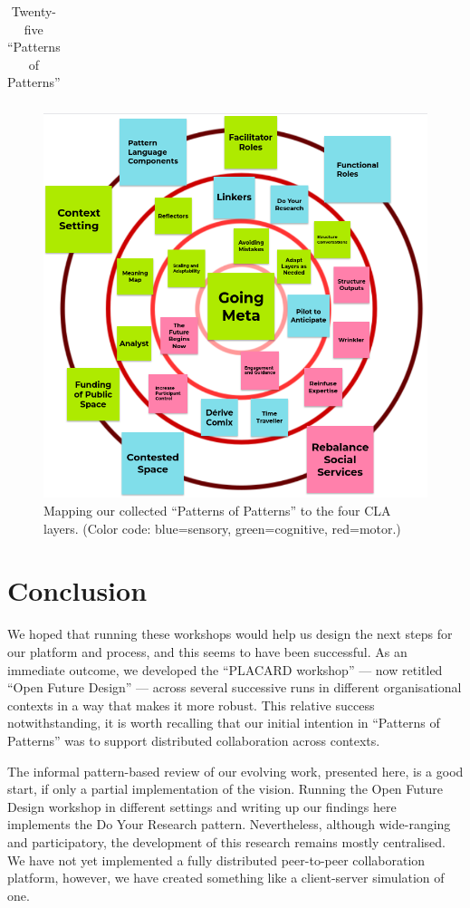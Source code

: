\documentclass[acmlarge,timestamp]{acmart}
\begin{document}
\begin{table}
\begin{tabular}{rll}
  \end{tabular}
  \smallskip
  \caption{Twenty-five “Patterns of Patterns”\label{summary}}
\end{table}

\begin{figure}[h]
\includegraphics[trim={0 0 0 .1cm},clip=true, width=.9\textwidth]{map-of-patterns.png}
\caption{Mapping our collected “Patterns of Patterns” to the four CLA layers. (Color code: blue=sensory, green=cognitive, red=motor.)\label{pattern-analysis}}
\end{figure}


\section{Conclusion}

We hoped that running these workshops would help us design the next
steps for our platform and process, and this seems to have been
successful.  As an immediate outcome, we developed the “PLACARD
workshop” — now retitled “Open Future Design” — across several
successive runs in different organisational contexts in a way that
makes it more robust.  This relative success notwithstanding, it is
worth recalling that our initial intention in “Patterns of Patterns”
was to support distributed collaboration across contexts.

The informal pattern-based review of our evolving work, presented
here, is a good start, if only a partial implementation of the vision.
Running the Open Future Design workshop in different settings and
writing up our findings here implements the {\sc Do Your Research}
pattern.  Nevertheless, although wide-ranging and participatory, the
development of this research remains mostly centralised.  We have not
yet implemented a fully distributed peer-to-peer collaboration
platform, however, we have created something like a client-server
simulation of one.
\end{document}
